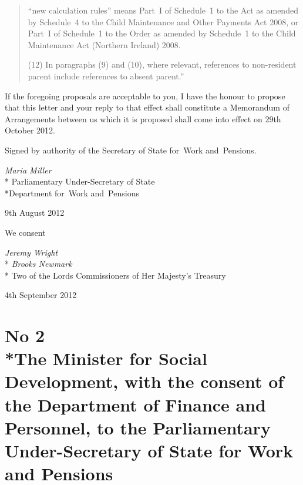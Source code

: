 \documentclass[12pt,a4paper]{article}
\begin{document}
\begin{enumerate}
\begin{quotation}
\begin{enumerate}
``new calculation rules'' means Part~I of Schedule~1 to the Act as amended by Schedule~4 to the Child Maintenance and Other Payments Act 2008, or Part~I of Schedule~1 to the Order as amended by Schedule~1 to the Child Maintenance Act (Northern Ireland) 2008.
\end{enumerate}

(12) In paragraphs (9) and (10), where relevant, references to non-resident parent include references to absent parent.''
\end{quotation}
\end{enumerate}

If the foregoing proposals are acceptable to you, I have the honour to propose that this letter and your reply to that effect shall constitute a Memorandum of Arrangements between us which it is proposed shall come into effect on 29th October 2012.

\bigskip

\pagebreak[3]

Signed 
by authority of the 
Secretary of State for~Work and~Pensions.

{\raggedleft
\emph{Maria Miller}\\*
Parliamentary Under-Secretary 
of State\\*Department 
for~Work and~Pensions

}

9th August 2012

\bigskip

\pagebreak[3]

We consent

{\raggedleft
\emph{Jeremy Wright}\\*
\emph{Brooks Newmark}\\*
Two of the Lords Commissioners of Her Majesty's Treasury

}

4th September 2012

\vfill

\section*{No 2\\*The Minister for Social Development, with the consent of the Department of Finance and Personnel, to the Parliamentary Under-Secretary of State for Work and Pensions}
\end{document}
